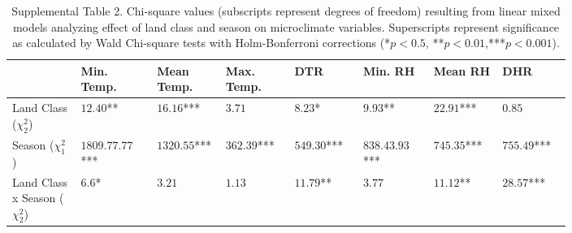 \documentclass[12pt]{article}
\begin{document}
\begin{table}
\centering
\begin{tabular}{P{0.10\linewidth}P{0.10\linewidth}P{0.10\linewidth}P{0.10\linewidth}P{0.10\linewidth}P{0.10\linewidth}P{0.10\linewidth}P{0.10\linewidth}}
\hline
\textbf{ } & \textbf{Min. Temp.} & \textbf{Mean Temp.} & \textbf{Max. Temp.}  & \textbf{DTR} & \textbf{Min. RH} & \textbf{Mean RH} & \textbf{DHR} \\
\hline

Land Class ($\chi^2_2$) 		& $12.40$**  		& $16.16$***  	& $3.71$		& $8.23$*		& $9.93$**		& $22.91$***	& $0.85$\\
Season 	($\chi^2_1$)			& $1809.77.77$*** 	& $1320.55$*** 	& $362.39$*** 	& $549.30$*** 	& $838.43.93$***& $745.35$***	& $755.49$***\\
Land Class x Season ($\chi^2_2$)& $6.6$* 			& $3.21$  		& $1.13$		& $11.79$**		& $3.77$		& $11.12$**		& $28.57$***\\
\hline
\end{tabular}
\caption{Supplemental Table 2. Chi-square values (subscripts represent degrees of freedom) resulting from linear mixed models analyzing effect of land class and season on microclimate variables. Superscripts represent significance as calculated by Wald Chi-square tests with Holm-Bonferroni corrections (*$p<0.5$, **$p<0.01$,***$p<0.001$).}
\end{table}


\newpage



\end{document}
